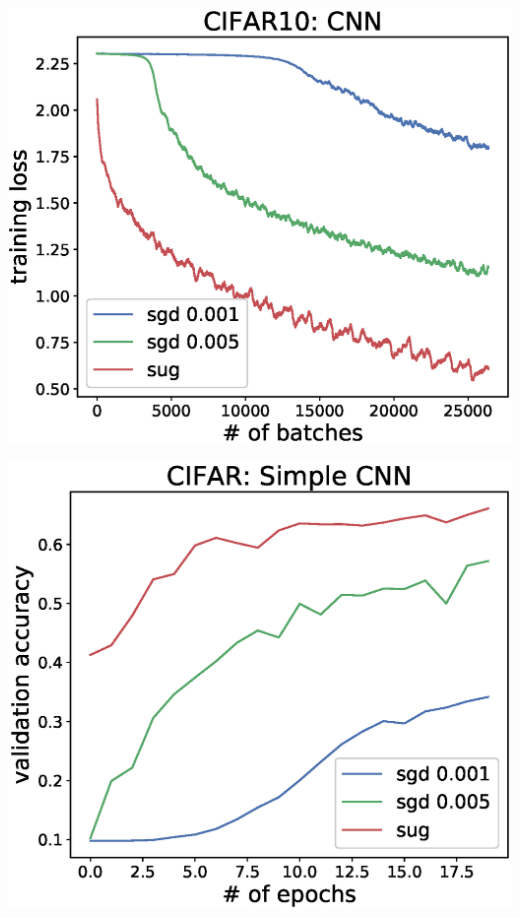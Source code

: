 \documentclass[a0]{a0poster}
\begin{document}
\begin{textblock}{7.0}
\begin{minipage}{0.35\textwidth}
	\begin{center}
		\includegraphics[width=1\textwidth]{figures/cifar_cnn_bt.eps}
	\end{center}
\end{minipage}
\begin{minipage}{0.35\textwidth}
	\begin{center}
		\includegraphics[width=1\textwidth]{figures/cifart_cnn_acc.eps}

\end{center}
\end{minipage}
\end{textblock}
\end{document}
